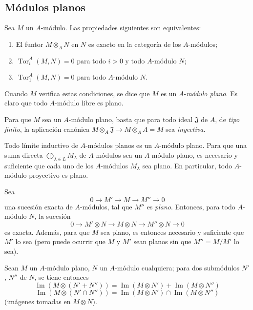 \subsection{Módulos planos}
\label{subsection:0.6.1-fr}

\begin{env}[6.1.1]
\label{0.6.1.1-fr}
Sea $M$ un $A$-módulo. Las propiedades siguientes son equivalentes:
\begin{enumerate}
  \item[$a)$] El funtor $M\otimes_A N$ en $N$ es exacto en la categoría
    de los $A$-módulos;
  \item[$b)$] $\operatorname{Tor}_i^A(M,N)=0$ para todo $i>0$ y todo
    $A$-módulo $N$;
  \item[$c)$] $\operatorname{Tor}_1^A(M,N)=0$ para todo $A$-módulo $N$.
\end{enumerate}

Cuando $M$ verifica estas condiciones, se dice que $M$ es un
$A$-\emph{módulo plano}. Es claro que todo $A$-módulo libre es plano.

Para que $M$ sea un $A$-módulo plano, basta que para todo ideal
$\mathfrak{J}$ de $A$, de \emph{tipo finito}, la aplicación canónica
$M\otimes_A\mathfrak{J}\to M\otimes_A A=M$ sea \emph{inyectiva}.
\end{env}

\begin{env}[6.1.2]
Todo límite inductivo de $A$-módulos planos es un $A$-módulo plano. Para
que una suma directa $\bigoplus_{\lambda\in L}M_\lambda$ de $A$-módulos sea
un $A$-módulo plano, es necesario y suficiente que cada uno de los $A$-módulos
$M_\lambda$ sea plano. En particular, todo $A$-módulo proyectivo es plano.

Sea
\[
  0\longrightarrow M'\longrightarrow M\longrightarrow M''\longrightarrow 0
\]
una sucesión exacta de $A$-módulos, tal que $M''$ es \emph{plano}. Entonces, para
todo $A$-módulo $N$, la sucesión
\[
  0\longrightarrow M'\otimes N\longrightarrow M\otimes N
  \longrightarrow M''\otimes N\longrightarrow 0
\]
es exacta. Además, para que $M$ sea plano, es entonces necesario y suficiente que
$M'$ lo sea (pero puede ocurrir que $M$ y $M'$ sean planos sin que
$M''=M/M'$ lo sea).
\end{env}

\begin{env}[6.1.3]
\label{0.6.1.3-fr}
Sean $M$ un $A$-módulo plano, $N$ un $A$-módulo cualquiera; para dos
submódulos $N'$, $N''$ de $N$, se tiene entonces
\[
  \operatorname{Im}(M\otimes(N'+N''))
  =\operatorname{Im}(M\otimes N')+\operatorname{Im}(M\otimes N'')
\]
\[
  \operatorname{Im}(M\otimes(N'\cap N''))
  =\operatorname{Im}(M\otimes N')\cap\operatorname{Im}(M\otimes N'')
\]
(imágenes tomadas en $M\otimes N$).
\end{env}

